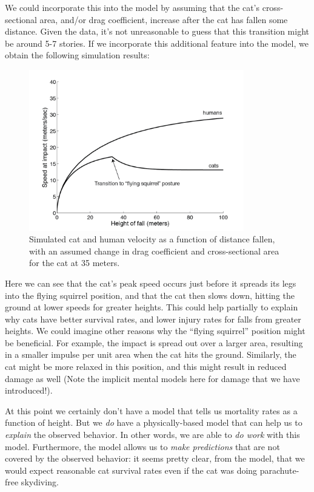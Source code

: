 We could incorporate this into the model by assuming that the cat's cross-sectional area, and/or drag coefficient, increase after the cat has fallen some distance.
Given the data, it's not unreasonable to guess that this transition might be around 5-7 stories.  If we incorporate this additional feature into the model, we obtain the following simulation results:

\begin{figure}

\centerline{\includegraphics[height=7cm]{figs/CatSpeedWithPosture}}

\caption{Simulated cat and human velocity as a function of distance fallen, with an assumed change in drag coefficient and cross-sectional area for the cat at 35 meters. }

\end{figure}



Here we can see that the cat's peak speed occurs just before it spreads its legs into the flying squirrel position, and that the cat then slows down, hitting the ground at lower speeds for greater heights.  This could help partially to explain why cats have better survival rates, and lower injury rates for falls from greater heights.  We could imagine other reasons why the ``flying squirrel'' position might be beneficial.  For example, the impact is spread out over a larger area, resulting in a smaller impulse per unit area when the cat hits the ground.  Similarly, the cat might be more relaxed in this position, and this might result in reduced damage as well (Note the implicit mental models here for damage that we have introduced!).

At this point we certainly don't have a model that tells us mortality rates as a function of height.  But we {\it do} have a physically-based model that can help us to {\it explain} the observed behavior.  In other words, we are able to {\it do work} with this model.  Furthermore, the model allows us to {\it make predictions} that are not covered by the observed behavior:  it seems pretty clear, from the model, that we would expect reasonable cat survival rates even if the cat was doing parachute-free skydiving.  

